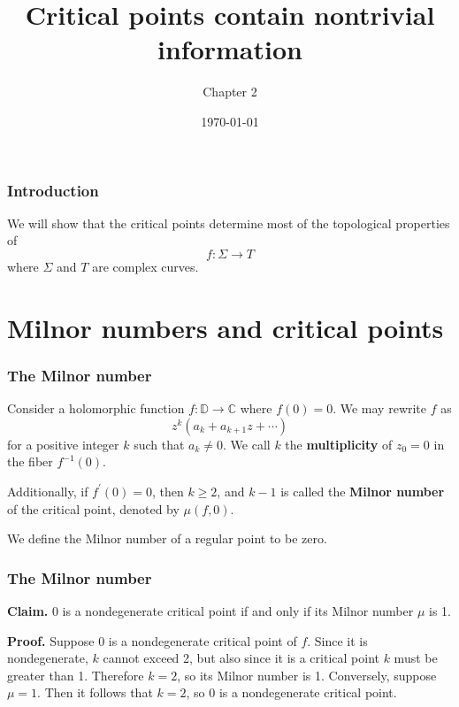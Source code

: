 \documentclass{beamer}
\title{Critical points contain nontrivial information}
\author{Chapter 2}
\institute{Complex Singularities}
\date{\today}
\begin{document}
\begin{frame}
\titlepage
\end{frame}



\begin{frame}
\frametitle{Introduction}

We will show that the critical points determine most of the topological properties of \[f : \Sigma \to T\] where $\Sigma$ and $T$ are complex curves.

\end{frame}


\section{Milnor numbers and critical points}

\begin{frame}
\frametitle{The Milnor number}

Consider a holomorphic function $f : \mathbb{D} \to \mathbb{C}$ where $f(0)=0$. We may rewrite $f$ as \[z^k(a_k + a_{k+1}z+ \cdots)\] for a positive integer $k$ such that $a_k \neq 0$. We call $k$ the \textbf{multiplicity} of $z_0 = 0$ in the fiber $f^{-1}(0)$.

\phantom{?}

Additionally, if $f^\prime(0) = 0$, then $k \geq 2$, and $k-1$ is called the \textbf{Milnor number} of the critical point, denoted by $\mu(f,0)$.

\phantom{?}

We define the Milnor number of a regular point to be zero.


\end{frame}


\begin{frame}
\frametitle{The Milnor number}

\textbf{Claim.} $0$ is a nondegenerate critical point if and only if its Milnor number $\mu$ is 1.

\phantom{?}

\textbf{Proof.} Suppose $0$ is a nondegenerate critical point of $f$. Since it is nondegenerate, $k$ cannot exceed 2, but also since it is a critical point $k$ must be greater than 1. Therefore $k = 2$, so its Milnor number is 1. Conversely, suppose $\mu = 1$. Then it follows that $k = 2$, so $0$ is a nondegenerate critical point.

\end{frame}
\end{document}
